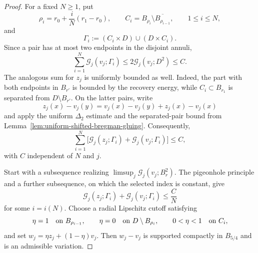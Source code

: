 \documentclass[11pt,reqno]{amsart}
\numberwithin{equation}{section}
\theoremstyle{remark}
\begin{document}
\begin{proof}
For a fixed \(N\ge1\), put
\[
 \rho_i=r_0+\frac{i}{N}(r_1-r_0),\qquad
 C_i=B_{\rho_i}\setminus\overline{B_{\rho_{i-1}}},
 \qquad 1\le i\le N,
\]
and
\[
 \Gamma_i:=(C_i\times D)\cup(D\times C_i).
\]
Since a pair has at most two endpoints in the disjoint annuli,
\[
 \sum_{i=1}^N\mathscr G_j(v_j;\Gamma_i)
 \le2\mathscr G_j(v_j;D^2)\le C.
\]
The analogous sum for \(z_j\) is uniformly bounded as well.  Indeed,
the part with both endpoints in \(B_{r'}\) is bounded by the recovery
energy, while \(C_i\subset B_{r_1}\) is separated from
\(D\setminus B_{r'}\).  On the latter pairs, write
\[
 z_j(x)-v_j(y)=v_j(x)-v_j(y)+z_j(x)-v_j(x)
\]
and apply the uniform \(\Delta_2\) estimate and the separated-pair
bound from Lemma~\ref{lem:uniform-shifted-bregman-gluing}.  Consequently,
\begin{equation*}
 \sum_{i=1}^N\bigl[
 \mathscr G_j(z_j;\Gamma_i)+\mathscr G_j(v_j;\Gamma_i)\bigr]\le C,
\end{equation*}
with \(C\) independent of \(N\) and \(j\).

Start with a subsequence realizing
\(\limsup_j\mathscr G_j(v_j;B_r^2)\).  The pigeonhole principle and a
further subsequence, on which the selected index is constant, give
\begin{equation}
 \mathscr G_j(z_j;\Gamma_i)+\mathscr G_j(v_j;\Gamma_i)
 \le\frac CN
 \label{eq:small-energy-subcollar}
\end{equation}
for some \(i=i(N)\).  Choose a radial Lipschitz cutoff satisfying
\[
 \eta=1\quad\hbox{on }B_{\rho_{i-1}},\qquad
 \eta=0\quad\hbox{on }D\setminus B_{\rho_i},\qquad
 0<\eta<1\quad\hbox{on }C_i,
\]
and set \(w_j=\eta z_j+(1-\eta)v_j\).  Then \(w_j-v_j\) is supported
compactly in \(B_{5/4}\) and is an admissible variation.


\end{proof}
\end{document}

